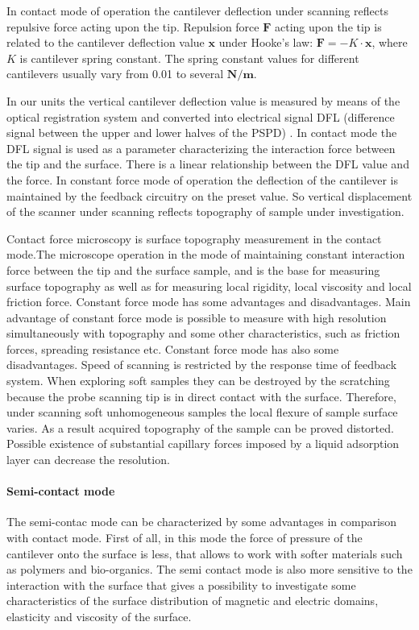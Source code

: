 In contact mode of operation the cantilever deflection under scanning reflects repulsive force acting upon the tip. Repulsion force $\mathbf{F}$ acting upon the tip is related to the cantilever deflection value $\mathbf{x}$ under Hooke's law: $\mathbf{F}=-K \cdot  \mathbf{x}$, where $K$ is cantilever spring constant. The spring constant values for different cantilevers usually vary from 0.01 to several $\mathbf{N/m}$.

In our units the vertical cantilever deflection value is measured by means of the optical registration system and converted into electrical signal DFL (difference signal between the upper and lower halves of the PSPD) . In contact mode the DFL signal is used as a parameter characterizing the interaction force between the tip and the surface. There is a linear relationship between the DFL value and the force. In constant force mode of operation the deflection of the cantilever is maintained by the feedback circuitry on the preset value. So vertical displacement of the scanner under scanning reflects topography of sample under investigation.

Contact force microscopy is surface topography measurement in the contact mode.The microscope operation in the mode of maintaining constant interaction force between the tip and the surface sample, and is the base for measuring surface topography as well as for measuring local rigidity, local viscosity and local friction force. Constant force mode has some advantages and disadvantages. Main advantage of constant force mode is possible to measure with high resolution simultaneously with topography and some other characteristics, such as friction forces, spreading resistance etc. Constant force mode has also some disadvantages. Speed of scanning is restricted by the response time of feedback system. When exploring soft samples they can be destroyed by the scratching because the probe scanning tip is in direct contact with the surface. Therefore, under scanning soft unhomogeneous samples the local flexure of sample surface varies. As a result acquired topography of the sample can be proved distorted. Possible existence of substantial capillary forces imposed by a liquid adsorption layer can decrease the resolution.

\paragraph{Semi-contact mode}

The semi-contac mode can be characterized by some advantages in comparison with contact mode. First of all, in this mode the force of pressure of the cantilever onto the surface is less, that allows to work with softer materials such as polymers and bio-organics. The semi contact mode is also more sensitive to the interaction with the surface that gives a possibility to investigate some characteristics of the surface distribution of magnetic and electric domains, elasticity and viscosity of the surface. 

